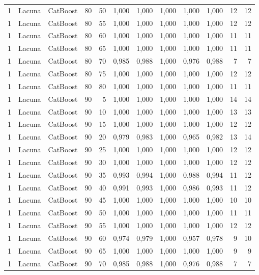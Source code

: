 \begin{longtable}{ccclrrrrrrrr}
1 & Lacuna & CatBoost & 80 & 50 & 1,000 & 1,000 & 1,000 & 1,000 & 1,000 & 12 & 12 \\
1 & Lacuna & CatBoost & 80 & 55 & 1,000 & 1,000 & 1,000 & 1,000 & 1,000 & 12 & 12 \\
1 & Lacuna & CatBoost & 80 & 60 & 1,000 & 1,000 & 1,000 & 1,000 & 1,000 & 11 & 11 \\
1 & Lacuna & CatBoost & 80 & 65 & 1,000 & 1,000 & 1,000 & 1,000 & 1,000 & 11 & 11 \\
1 & Lacuna & CatBoost & 80 & 70 & 0,985 & 0,988 & 1,000 & 0,976 & 0,988 & 7 & 7 \\
1 & Lacuna & CatBoost & 80 & 75 & 1,000 & 1,000 & 1,000 & 1,000 & 1,000 & 12 & 12 \\
1 & Lacuna & CatBoost & 80 & 80 & 1,000 & 1,000 & 1,000 & 1,000 & 1,000 & 11 & 11 \\
1 & Lacuna & CatBoost & 90 & 5 & 1,000 & 1,000 & 1,000 & 1,000 & 1,000 & 14 & 14 \\
1 & Lacuna & CatBoost & 90 & 10 & 1,000 & 1,000 & 1,000 & 1,000 & 1,000 & 13 & 13 \\
1 & Lacuna & CatBoost & 90 & 15 & 1,000 & 1,000 & 1,000 & 1,000 & 1,000 & 12 & 12 \\
1 & Lacuna & CatBoost & 90 & 20 & 0,979 & 0,983 & 1,000 & 0,965 & 0,982 & 13 & 14 \\
1 & Lacuna & CatBoost & 90 & 25 & 1,000 & 1,000 & 1,000 & 1,000 & 1,000 & 12 & 12 \\
1 & Lacuna & CatBoost & 90 & 30 & 1,000 & 1,000 & 1,000 & 1,000 & 1,000 & 12 & 12 \\
1 & Lacuna & CatBoost & 90 & 35 & 0,993 & 0,994 & 1,000 & 0,988 & 0,994 & 11 & 12 \\
1 & Lacuna & CatBoost & 90 & 40 & 0,991 & 0,993 & 1,000 & 0,986 & 0,993 & 11 & 12 \\
1 & Lacuna & CatBoost & 90 & 45 & 1,000 & 1,000 & 1,000 & 1,000 & 1,000 & 10 & 10 \\
1 & Lacuna & CatBoost & 90 & 50 & 1,000 & 1,000 & 1,000 & 1,000 & 1,000 & 11 & 11 \\
1 & Lacuna & CatBoost & 90 & 55 & 1,000 & 1,000 & 1,000 & 1,000 & 1,000 & 12 & 12 \\
1 & Lacuna & CatBoost & 90 & 60 & 0,974 & 0,979 & 1,000 & 0,957 & 0,978 & 9 & 10 \\
1 & Lacuna & CatBoost & 90 & 65 & 1,000 & 1,000 & 1,000 & 1,000 & 1,000 & 9 & 9 \\
1 & Lacuna & CatBoost & 90 & 70 & 0,985 & 0,988 & 1,000 & 0,976 & 0,988 & 7 & 7 \\

\end{longtable}
